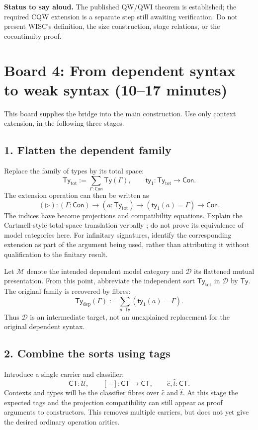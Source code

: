 \documentclass[11pt]{article}
\newcommand{\Con}{\mathsf{Con}}
\newcommand{\Ty}{\mathsf{Ty}}
\newcommand{\CT}{\mathsf{CT}}
\newcommand{\Mutual}{\mathcal{D}}
\newcommand{\Dependent}{\mathcal{M}}
\newcommand{\ext}{\mathbin{\triangleright}}
\newcommand{\ctag}{\widehat c}
\newcommand{\ttag}{\widehat t}
\newcommand{\tyone}{\mathsf{ty}_1}
\begin{document}
\textbf{Status to say aloud.} The published QW/QWI theorem is established;
the required CQW extension is a separate step still awaiting verification.
Do not present WISC's definition, the size construction, stage relations,
or the cocontinuity proof.

\section*{Board 4: From dependent syntax to weak syntax (10--17 minutes)}

This board supplies the bridge into the main construction. Use only context
extension, in the following three stages.

\subsection*{1. Flatten the dependent family}

Replace the family of types by its total space:
\[
 \Ty_{\mathrm{tot}}:=\sum_{\Gamma:\Con}\Ty(\Gamma),
 \qquad \tyone:\Ty_{\mathrm{tot}}\to\Con.
\]
The extension operation can then be written as
\[
 ({\ext}):(\Gamma:\Con)\to(a:\Ty_{\mathrm{tot}})
          \to(\tyone(a)=\Gamma)\to\Con.
\]
The indices have become projections and compatibility equations.
Explain the Cartmell-style total-space translation verbally
\cite{Cartmell86}; do not prove its equivalence of model categories here.
For infinitary signatures, identify the corresponding extension as part of
the argument being used, rather than attributing it without qualification
to the finitary result.

Let \(\Dependent\) denote the intended dependent model category and
\(\Mutual\) its flattened mutual presentation. From this point, abbreviate
the independent sort \(\Ty_{\mathrm{tot}}\) in \(\Mutual\) by \(\Ty\).
The original family is recovered by fibres:
\[
 \Ty_{\mathrm{dep}}(\Gamma)
   :=\sum_{a:\Ty}(\tyone(a)=\Gamma).
\]
Thus \(\Mutual\) is an intermediate target, not an unexplained replacement
for the original dependent syntax.

\subsection*{2. Combine the sorts using tags}

Introduce a single carrier and classifier:
\[
 \CT:\mathcal U,\qquad [-]:\CT\to\CT,\qquad
 \ctag,\ttag:\CT.
\]
Contexts and types will be the classifier fibres over \(\ctag\) and
\(\ttag\). At this stage the expected tags and the projection compatibility
can still appear as proof arguments to constructors. This removes multiple
carriers, but does not yet give the desired ordinary operation arities.
\end{document}
